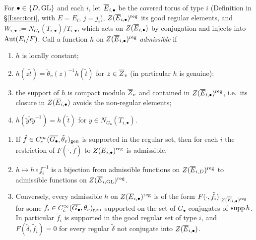 For $\bullet\in\{D,\mathrm{GL}\}$ and each $i$, let $\overline{E}_{i,\bullet}$ be the covered torus of type $i$ (Definition in \S\ref{I:sec:tori}, with $E=E_i$, $j=j_i$), $Z(\overline{E}_{i,\bullet})^{\mathrm{reg}}$ its good regular elements, and $W_{i,\bullet}:=N_{G_\bullet}(T_{i,\bullet})/T_{i,\bullet}$, which acts on $Z(\overline{E}_{i,\bullet})$ by conjugation and injects into $\operatorname{Aut}(E_i/F)$. Call a function $h$ on $Z(\overline{E}_{i,\bullet})^{\mathrm{reg}}$ \emph{admissible} if
\begin{enumerate}[label=(\roman*)]
\item $h$ is locally constant;
\item $h(z\tilde t)=\tilde\theta_v(z)^{-1}h(\tilde t)$ for $z\in\overline{Z}_v$ (in particular $h$ is genuine);
\item the support of $h$ is compact modulo $\overline{Z}_v$ and contained in $Z(\overline{E}_{i,\bullet})^{\mathrm{reg}}$, i.e.\ its closure in $Z(\overline{E}_{i,\bullet})$ avoids the non-regular elements;
\item $h(\tilde y\tilde t\tilde y^{-1})=h(\tilde t)$ for $y\in N_{G_\bullet}(T_{i,\bullet})$.
\end{enumerate}

\begin{lemma}\label{I:lem:transported}
\begin{enumerate}[label=(\alph*)]
\item If $\tilde f\in C_c^\infty(\overline{G_\bullet},\tilde\theta_v)_{\mathrm{gen}}$ is supported in the regular set, then for each $i$ the restriction of $F(\cdot,\tilde f)$ to $Z(\overline{E}_{i,\bullet})^{\mathrm{reg}}$ is admissible.
\item $h\mapsto h\circ\jj_i^{-1}$ is a bijection from admissible functions on $Z(\overline{E}_{i,D})^{\mathrm{reg}}$ to admissible functions on $Z(\overline{E}_{i,\mathrm{GL}})^{\mathrm{reg}}$.
\item Conversely, every admissible $h$ on $Z(\overline{E}_{i,\bullet})^{\mathrm{reg}}$ is of the form $F(\cdot,\tilde f_i)|_{Z(\overline{E}_{i,\bullet})^{\mathrm{reg}}}$ for some $\tilde f_i\in C_c^\infty(\overline{G_\bullet},\tilde\theta_v)_{\mathrm{gen}}$ supported on the set of $G_\bullet$-conjugates of $\operatorname{supp} h$. In particular $\tilde f_i$ is supported in the good regular set of type $i$, and $F(\tilde\delta,\tilde f_i)=0$ for every regular $\tilde\delta$ not conjugate into $Z(\overline{E}_{i,\bullet})$.
\end{enumerate}
\end{lemma}

